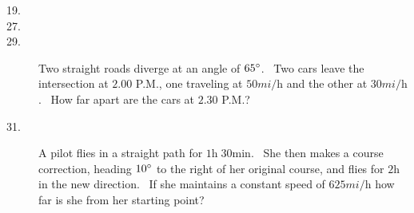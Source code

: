 \begin{description}
\item [19.]   
\columnsep =30pt
 

\item [27.]
\columnsep =30pt
 

\item [29.]
Two straight roads diverge at an angle of $65 \mbox{{\ensuremath{{}^\circ}}}$. \ Two cars leave the intersection at $2.00$ P.M., one traveling at $50 mi/\mbox{h}$ and the other at $30 mi/\mbox{h}$. \ How far apart are the cars at $2.30$ P.M.? 

\item [31.] A pilot flies
in a straight path for $1 \mbox{h}\; 30 \mbox{min}$. \ She then makes a course correction, heading $10 \mbox{{\ensuremath{{}^\circ}}}$ to the right of her original course, and flies for $2 \mbox{h}$ in the new direction. \ If she
maintains a constant speed of $625 mi/\mbox{h}$ how far is she from her starting point? 


\end{description}
